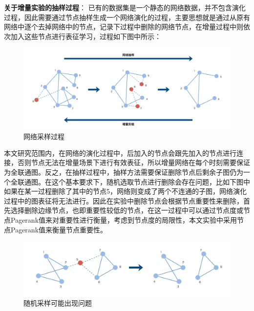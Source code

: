 \remark \textbf{关于增量实验的抽样过程}： 已有的数据集是一个静态的网络数据，并不包含演化过程，因此需要通过节点抽样生成一个网络演化的过程，主要思想就是通过从原有网络中逐个去掉网络中的节点，记录下过程中删除的网络节点，在增量过程中则依次加入这些节点进行表征学习，过程如下图中所示：
\begin{figure}
	\centering
	\includegraphics[width=6.2in]{figures/inc_sample}
	\caption{网络采样过程}
\end{figure}


本文研究范围内，在网络的演化过程中，后加入的节点会跟先加入的节点进行连接，否则节点无法在增量场景下进行有效表征，所以增量网络在每个时刻需要保证为全联通图。反之，在抽样过程中，抽样方法需要保证删除节点后剩余子图仍为一个全联通图。在这个基本要求下，随机选取节点进行删除会存在问题，比如下图中如果在某一过程删除了其中的节点5，网络则变成了两个不连通的子图，网络演化过程中的图表征将无法进行。因此在实验中删除节点会根据节点重要性来删除，首先选择删除边缘节点，也即重要性较低的节点，在这一过程中可以通过节点度或节点Pagerank值\cite{page1999pagerank}来对重要性进行衡量，考虑到节点度的局限性，本文实验中采用节点Pagerank值来衡量节点重要性。
\begin{figure}
	\centering
	\includegraphics[width=6.2in]{figures/sample_split}
	\caption{随机采样可能出现问题}
\end{figure}









